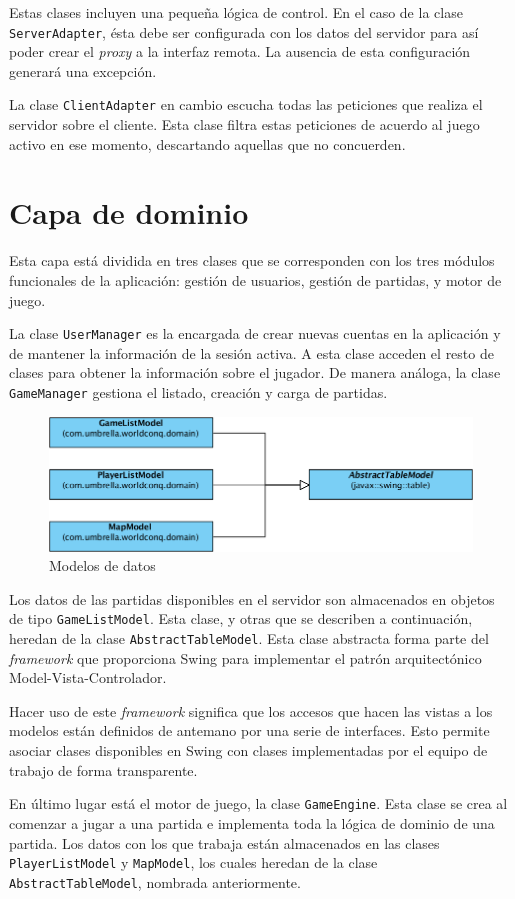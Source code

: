 Estas clases incluyen una pequeña lógica de control. En el caso de la clase
\texttt{ServerAdapter}, ésta debe ser configurada con los datos del servidor
para así poder crear el \textit{proxy} a la interfaz remota. La ausencia de
esta configuración generará una excepción.

La clase \texttt{ClientAdapter} en cambio escucha todas las peticiones que
realiza el servidor sobre el cliente. Esta clase filtra estas peticiones de
acuerdo al juego activo en ese momento, descartando aquellas que no concuerden.

\section{Capa de dominio}

Esta capa está dividida en tres clases que se corresponden con los tres módulos
funcionales de la aplicación: gestión de usuarios, gestión de partidas, y motor
de juego.

La clase \texttt{UserManager} es la encargada de crear nuevas cuentas en la
aplicación y de mantener la información de la sesión activa. A esta clase
acceden el resto de clases para obtener la información sobre el jugador. De
manera análoga, la clase \texttt{GameManager} gestiona el listado, creación y
carga de partidas.

\begin{figure}[h]
\caption{Modelos de datos}
\centering
\includegraphics[scale=0.4]{img/ch02arch-models.png}
\end{figure}

Los datos de las partidas disponibles en el servidor son almacenados en objetos
de tipo \texttt{GameListModel}. Esta clase, y otras que se describen a
continuación, heredan de la clase \texttt{AbstractTableModel}. Esta clase
abstracta forma parte del \textit{framework} que proporciona Swing para
implementar el patrón arquitectónico Model-Vista-Controlador.

Hacer uso de este \textit{framework} significa que los accesos que hacen las
vistas a los modelos están definidos de antemano por una serie de interfaces.
Esto permite asociar clases disponibles en Swing con clases implementadas por el
equipo de trabajo de forma transparente.

En último lugar está el motor de juego, la clase \texttt{GameEngine}. Esta
clase se crea al comenzar a jugar a una partida e implementa toda la lógica de
dominio de una partida. Los datos con los que trabaja están almacenados en las
clases \texttt{PlayerListModel} y \texttt{MapModel}, los cuales heredan de la
clase \texttt{AbstractTableModel}, nombrada anteriormente.
